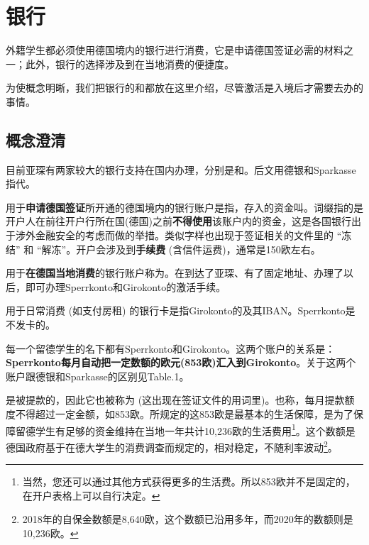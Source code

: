 
\chapter{银行}

外籍学生都必须使用德国境内的银行进行消费，它是申请德国签证必需的材料之一；此外，银行的选择涉及到在当地消费的便捷度。

为使概念明晰，我们把银行的和都放在这里介绍，尽管激活是入境后才需要去办的事情。

\section{概念澄清}
 
目前亚琛有两家较大的银行支持在国内办理，分别是\href{https://www.deutsche-bank.de/pk.html}{}和\href{https://www.sparkasse-aachen.de/de/home.html}{}。后文用德银和Sparkasse指代。

用于\textbf{申请德国签证}所开通的德国境内的银行账户是指，存入的资金叫。词缀指的是开户人在前往开户行所在国(德国)之前\textbf{不得使用}该账户内的资金，这是各国银行出于涉外金融安全的考虑而做的举措。类似字样也出现于签证相关的文件里的 “冻结” 和 “解冻”。开户会涉及到\textbf{手续费} (含信件运费)，通常是150欧左右。

用于\textbf{在德国当地消费}的银行账户称为。在到达了亚琛、有了固定地址、办理了以后，即可办理Sperrkonto和Girokonto的激活手续。

用于日常消费 (如支付房租) 的银行卡是指Girokonto的及其IBAN。Sperrkonto是不发卡的。

每一个留德学生的名下都有Sperrkonto和Girokonto。这两个账户的关系是：\textbf{Sperrkonto每月自动把一定数额的欧元(853欧)汇入到Girokonto}。关于这两个账户跟德银和Sparkasse的区别见Table.1。

是被提款的，因此它也被称为 (这出现在签证文件的用词里)。也称，每月提款额度不得超过一定金额，如853欧。所规定的这853欧是最基本的生活保障，是为了保障留德学生有足够的资金维持在当地一年共计10,236欧的生活费用\footnote{当然，您还可以通过其他方式获得更多的生活费。所以853欧并不是固定的，在开户表格上可以自行决定。}。这个数额是德国政府基于在德大学生的消费调查而规定的，相对稳定，不随利率波动\footnote{2018年的自保金数额是8,640欧，这个数额已沿用多年，而2020年的数额则是10,236欧。}。

